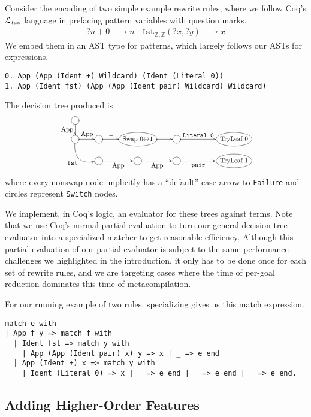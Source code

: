 \documentclass[a4paper,USenglish,cleveref,autoref,thm-restate]{lipics-v2021}
\newcommand{\Ltac}{\ensuremath{\mathcal{L}_\text{\emph{tac}}}}
\begin{document}
Consider the encoding of two simple example rewrite rules, where we follow Coq's \Ltac{} language in prefacing pattern variables with question marks.
\begin{align*}
  ?n + 0 & \to n %
  &
  \texttt{fst}_{\mathbb{Z},\mathbb{Z}}(?x, ?y) & \to x
\end{align*}
We embed them in an AST type for patterns, which largely follows our ASTs for expressions.
\begin{verbatim}
0. App (App (Ident +) Wildcard) (Ident (Literal 0))
1. App (Ident fst) (App (App (Ident pair) Wildcard) Wildcard)
\end{verbatim}
The decision tree produced is\label{sec:compiled-pattern}
\[\resizebox{230px}{!}{\xymatrix@R-1pc{
  *++[o][F-]\txt{} \ar[d]_{\txt{App}} \\
  *++[o][F-]\txt{} \ar[r]^-{\txt{App}} \ar@/_1.5pc/[dr]_{\txt{\texttt{fst}}} & *++[o][F-]\txt{} \ar[r]^-{+} & *++[o][F-]\txt{Swap 0$\leftrightarrow$1} \ar[r] & *++[o][F-]\txt{} \ar[rr]^-{\txt{\texttt{Literal~0}}} && *++[o][F-]\txt{TryLeaf 0} \\
  & *++[o][F-]\txt{} \ar[r]_-{\txt{App}} & *++[o][F-]\txt{} \ar[r]_-{\txt{App}} & *++[o][F-]\txt{} \ar[rr]_-{\txt{\texttt{pair}}} && *++[o][F-]\txt{TryLeaf 1}
}}\]
\noindent where every nonswap node implicitly has a ``default'' case arrow to \texttt{Failure} and circles represent \texttt{Switch} nodes.

We implement, in Coq's logic, an evaluator for these trees against terms.
Note that we use Coq's normal partial evaluation to turn our general decision-tree evaluator into a specialized matcher to get reasonable efficiency.
Although this partial evaluation of our partial evaluator is subject to the same performance challenges we highlighted in the introduction, it only has to be done once for each set of rewrite rules, and we are targeting cases where the time of per-goal reduction dominates this time of metacompilation.

For our running example of two rules, specializing gives us this match expression.
\begin{verbatim}
match e with
| App f y => match f with
  | Ident fst => match y with
    | App (App (Ident pair) x) y => x | _ => e end
  | App (Ident +) x => match y with
    | Ident (Literal 0) => x | _ => e end | _ => e end | _ => e end.
\end{verbatim}

\subsection{Adding Higher-Order Features}\label{sec:thunk-eval-subst-term}
\end{document}
